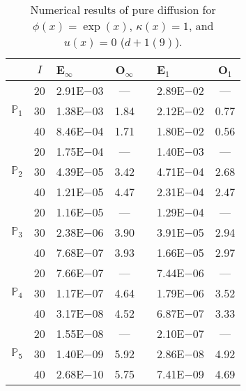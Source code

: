 \begin{table}[H]
\centering
\caption{Numerical results of pure diffusion for $\phi(x)=\exp(x)$, $\kappa(x)=1$, and $u(x)=0$ ($d+1(9)$).}
\begin{tabular}{@{}l c l c c l c@{}}
\toprule
 & $I$ & E$_{\infty}$ & O$_{\infty}$ && E$_1$ & O$_1$\\
\midrule
\multirow{3}{*}{$\mathbb{P}_{1}$}
 & 20 & 2.91E$-$03 & --- && 2.89E$-$02 & ---\\
 & 30 & 1.38E$-$03 & 1.84 && 2.12E$-$02 & 0.77\\
 & 40 & 8.46E$-$04 & 1.71 && 1.80E$-$02 & 0.56\\
\midrule
\multirow{3}{*}{$\mathbb{P}_{2}$}
 & 20 & 1.75E$-$04 & --- && 1.40E$-$03 & ---\\
 & 30 & 4.39E$-$05 & 3.42 && 4.71E$-$04 & 2.68\\
 & 40 & 1.21E$-$05 & 4.47 && 2.31E$-$04 & 2.47\\
\midrule
\multirow{3}{*}{$\mathbb{P}_{3}$}
 & 20 & 1.16E$-$05 & --- && 1.29E$-$04 & ---\\
 & 30 & 2.38E$-$06 & 3.90 && 3.91E$-$05 & 2.94\\
 & 40 & 7.68E$-$07 & 3.93 && 1.66E$-$05 & 2.97\\
\midrule
\multirow{3}{*}{$\mathbb{P}_{4}$}
 & 20 & 7.66E$-$07 & --- && 7.44E$-$06 & ---\\
 & 30 & 1.17E$-$07 & 4.64 && 1.79E$-$06 & 3.52\\
 & 40 & 3.17E$-$08 & 4.52 && 6.87E$-$07 & 3.33\\
\midrule
\multirow{3}{*}{$\mathbb{P}_{5}$}
 & 20 & 1.55E$-$08 & --- && 2.10E$-$07 & ---\\
 & 30 & 1.40E$-$09 & 5.92 && 2.86E$-$08 & 4.92\\
 & 40 & 2.68E$-$10 & 5.75 && 7.41E$-$09 & 4.69\\
\bottomrule
\end{tabular}
\end{table}